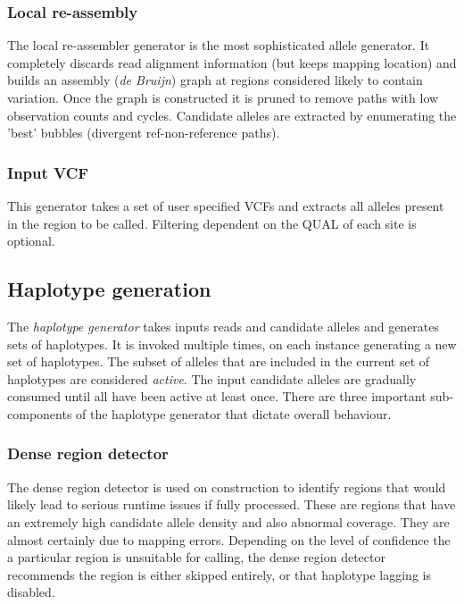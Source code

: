 \documentclass{article}
\begin{document}
\subsubsection{Local re-assembly}

The local re-assembler generator is the most sophisticated allele generator. It completely discards read alignment information (but keeps mapping location) and builds an assembly (\emph{de Bruijn}) graph at regions considered likely to contain variation. Once the graph is constructed it is pruned to remove paths with low observation counts and cycles. Candidate alleles are extracted by enumerating the 'best' bubbles (divergent ref-non-reference paths).

\subsubsection{Input VCF}

This generator takes a set of user specified VCFs and extracts all alleles present in the region to be called. Filtering dependent on the QUAL of each site is optional.

\subsection{Haplotype generation}\label{haplotype-generation}

The \emph{haplotype generator} takes inputs reads and candidate alleles and generates sets of haplotypes. It is invoked multiple times, on each instance generating a new set of haplotypes. The subset of alleles that are included in the current set of haplotypes are considered \emph{active}. The input candidate alleles are gradually consumed until all have been active at least once. There are three important sub-components of the haplotype generator that dictate overall behaviour. 

\subsubsection{Dense region detector}

The dense region detector is used on construction to identify regions that would likely lead to serious runtime issues if fully processed. These are regions that have an extremely high candidate allele density and also abnormal coverage. They are almost certainly due to mapping errors. Depending on the level of confidence the a particular region is unsuitable for calling, the dense region detector recommends the region is either skipped entirely, or that haplotype lagging is disabled.
\end{document}
